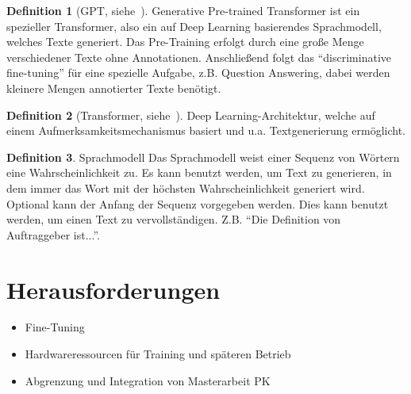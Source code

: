 \documentclass[a4paper]{article}
\theoremstyle{definition}
\newtheorem{definition}{Definition}[section]
\begin{document}
\begin{definition}[GPT, siehe~\citet{gpt,gptreport}]
Generative Pre-trained Transformer ist ein spezieller Transformer, also ein auf Deep Learning basierendes Sprachmodell, welches Texte generiert.
Das Pre-Training erfolgt durch eine große Menge verschiedener Texte ohne Annotationen.
Anschließend folgt das \enquote{discriminative fine-tuning} für eine spezielle Aufgabe, z.B. Question Answering, dabei werden kleinere Mengen annotierter Texte benötigt.
\end{definition}

\begin{definition}[Transformer, siehe~\citet{transformer}]
Deep Learning-Architektur, welche auf einem Aufmerksamkeitsmechanismus basiert und u.a. Textgenerierung ermöglicht.
\end{definition}

\begin{definition}{Sprachmodell}
Das Sprachmodell weist einer Sequenz von Wörtern eine Wahrscheinlichkeit zu.
Es kann benutzt werden, um Text zu generieren, in dem immer das Wort mit der höchsten Wahrscheinlichkeit generiert wird.
Optional kann der Anfang der Sequenz vorgegeben werden.
Dies kann benutzt werden, um einen Text zu vervollständigen.
Z.B. \enquote{Die Definition von Auftraggeber ist...}.
\end{definition}



\section{Herausforderungen}

\begin{itemize}
\item Fine-Tuning
\item Hardwareressourcen für Training und späteren Betrieb
\item Abgrenzung und Integration von Masterarbeit PK
\end{itemize}



\end{document}
